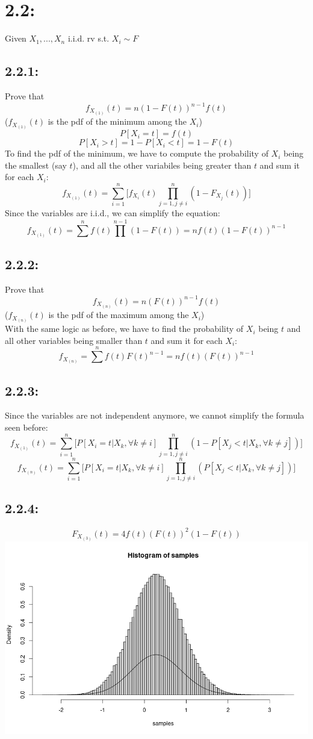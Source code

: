 \documentclass{article}
\begin{document}
\section*{2.2:}
Given $X_1,...,X_n$ i.i.d. rv s.t. $X_i\sim F$
\subsection*{2.2.1:}
Prove that $$f_{X_{(1)}}(t)=n(1-F(t))^{n-1}f(t)$$($f_{X_{(1)}}(t)$ is the pdf of the minimum among the $X_i$)\\
\newline
$$P[X_i=t]=f(t)$$
$$P[X_i>t]=1-P[X_i<t]=1-F(t)$$
To find the pdf of the minimum, we have to compute the probability of $X_i$ being the smallest (say $t$), and all the other variabiles being greater than $t$ and sum it for each $X_i$:
$$f_{X_{(1)}}(t)=\sum_{i=1}^{n}\biggl[f_{X_i}(t)\prod_{j=1,j\neq i}^n(1-F_{X_j}(t))\biggr]$$
Since the variables are i.i.d., we can simplify the equation:
$$f_{X_{(1)}}(t)=\sum^nf(t)\prod^{n-1}(1-F(t))=nf(t)(1-F(t))^{n-1}$$
\subsection*{2.2.2:}
Prove that $$f_{X_{(n)}}(t)=n(F(t))^{n-1}f(t)$$($f_{X_{(n)}}(t)$ is the pdf of the maximum among the $X_i$)\\
\newline
With the same logic as before, we have to find the probability of $X_i$ being $t$ and all other variables being smaller than $t$ and sum it for each $X_i$:
$$f_{X_{(n)}}=\sum^nf(t)F(t)^{n-1}=nf(t)(F(t))^{n-1}$$
\subsection*{2.2.3:}
Since the variables are not independent anymore, we cannot simplify the formula seen before:
$$f_{X_{(1)}}(t)=\sum_{i=1}^{n}\biggl[P[X_i=t|X_k,\forall k\neq i]\prod_{j=1,j\neq i}^n(1-P[X_j<t|X_k,\forall k\neq j])\biggr]$$
$$f_{X_{(n)}}(t)=\sum_{i=1}^{n}\biggl[P[X_i=t|X_k,\forall k\neq i]\prod_{j=1,j\neq i}^n(P[X_j<t|X_k,\forall k\neq j])\biggr]$$
\subsection*{2.2.4:}
$$F_{X_{(3)}}(t)=4f(t)(F(t))^2(1-F(t))$$
\includegraphics[width=\textwidth]{img/2-2-4.png}
\end{document}
